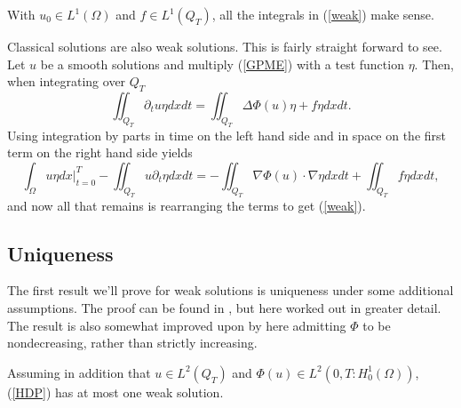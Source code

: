 \documentclass[11pt, a4paper]{article}
\begin{document}
\setcounter{obs}{0}
\begin{obs}
With $u_0 \in L^1(\Omega)$ and $f\in L^1(Q_T)$, all the integrals in (\ref{weak}) make sense.
\end{obs}
\begin{obs}
Classical solutions are also weak solutions. This is fairly straight forward to see. Let $u$ be a smooth solutions and multiply (\ref{GPME}) with a test function $\eta$. Then, when integrating over $Q_T$
\begin{equation*}
\iint_{Q_T}\partial_t u \eta dxdt = \iint_{Q_T}\Delta\Phi(u) \eta + f\eta dxdt.
\end{equation*}
Using integration by parts in time on the left hand side and in space on the first term on the right hand side yields
\begin{equation*}
\int_\Omega u\eta dx \Bigg|_{t=0}^T - \iint_{Q_T}u\partial_t \eta dxdt = -\iint_{Q_T}\nabla \Phi(u) \cdot \nabla \eta dxdt + \iint_{Q_T}f\eta dxdt,
\end{equation*}
and now all that remains is rearranging the terms to get (\ref{weak}).
\end{obs}

\subsection{Uniqueness}
The first result we'll prove for weak solutions is uniqueness under some additional assumptions. The proof can be found in \citep{vazquez2007porous}, but here worked out in greater detail. The result is also somewhat improved upon by here admitting $\Phi$ to be nondecreasing, rather than strictly increasing.
\begin{theorem}[Uniqueness]
\label{thm:uniqueness}
	Assuming in addition that $u \in L^2(Q_T)$ and $\Phi(u) \in L^2(0,T : H_0^1(\Omega))$, (\ref{HDP}) has at most one weak solution.
\end{theorem}
\end{document}
